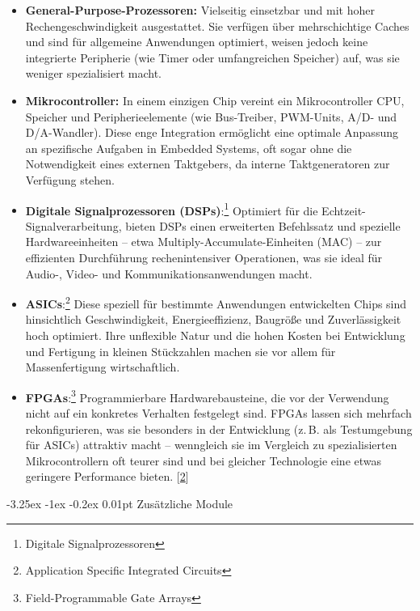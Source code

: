 \documentclass[
    headings=optiontotocandhead,%
    twoside,
    numbers=noenddot,%
    12pt, %
    titlepage, %
    parskip=full, %
    listof=leveldown, 
    numbers=noenddot, %
    a4paper,DIV=14,
    BCOR=15mm,
]{scrbook}
\makeatletter
\renewcommand\paragraph{\@startsection{paragraph}{4}{\z@}%
    {-3.25ex \@plus -1ex \@minus -0.2ex}%
    {0.01pt}%
    {\raggedsection\normalfont\sectfont\nobreak\size@paragraph}%
  }
\makeatother
\begin{document}
\begin{itemize}
\item
  \textbf{General-Purpose-Prozessoren:} Vielseitig einsetzbar und mit
  hoher Rechengeschwindigkeit ausgestattet. Sie verfügen über
  mehrschichtige Caches und sind für allgemeine Anwendungen optimiert,
  weisen jedoch keine integrierte Peripherie (wie Timer oder
  umfangreichen Speicher) auf, was sie weniger spezialisiert macht.
\item
  \textbf{Mikrocontroller:} In einem einzigen Chip vereint ein
  Mikrocontroller CPU, Speicher und Peripherieelemente (wie Bus-Treiber,
  PWM-Units, A/D- und D/A-Wandler). Diese enge Integration ermöglicht
  eine optimale Anpassung an spezifische Aufgaben in Embedded Systems,
  oft sogar ohne die Notwendigkeit eines externen Taktgebers, da interne
  Taktgeneratoren zur Verfügung stehen.
\item
  \textbf{Digitale Signalprozessoren (DSPs)}:\footnote{Digitale
    Signalprozessoren} Optimiert für die Echtzeit-Signalverarbeitung,
  bieten DSPs einen erweiterten Befehlssatz und spezielle
  Hardwareeinheiten -- etwa Multiply-Accumulate-Einheiten (MAC) -- zur
  effizienten Durchführung rechenintensiver Operationen, was sie ideal
  für Audio-, Video- und Kommunikationsanwendungen macht.
\item
  \textbf{ASICs}:\footnote{Application Specific Integrated Circuits}
  Diese speziell für bestimmte Anwendungen entwickelten Chips sind
  hinsichtlich Geschwindigkeit, Energieeffizienz, Baugröße und
  Zuverlässigkeit hoch optimiert. Ihre unflexible Natur und die hohen
  Kosten bei Entwicklung und Fertigung in kleinen Stückzahlen machen sie
  vor allem für Massenfertigung wirtschaftlich.
\item
  \textbf{FPGAs}:\footnote{Field-Programmable Gate Arrays}
  Programmierbare Hardwarebausteine, die vor der Verwendung nicht auf
  ein konkretes Verhalten festgelegt sind. FPGAs lassen sich mehrfach
  rekonfigurieren, was sie besonders in der Entwicklung (z.\,B. als
  Testumgebung für ASICs) attraktiv macht -- wenngleich sie im Vergleich
  zu spezialisierten Mikrocontrollern oft teurer sind und bei gleicher
  Technologie eine etwas geringere Performance bieten.
  {[}\protect\hyperlink{ref-EmbeddedSystems}{2}{]}
\end{itemize}

\hypertarget{zusuxe4tzliche-module}{%
\paragraph{Zusätzliche Module}\label{zusuxe4tzliche-module}}
\end{document}
